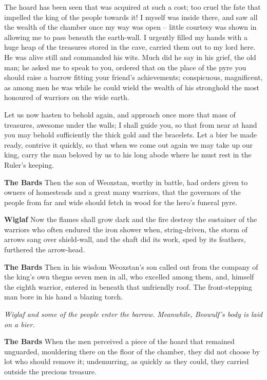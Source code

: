 \documentclass[a4paper]{article}
\begin{document}
{The hoard has been seen
that was acquired at such a cost; too cruel the fate
that impelled the king of the people towards it!
I myself was inside there, and saw all
the wealth of the chamber once my way was open
– little courtesy was shown in allowing me to pass
beneath the earth-wall. I urgently filled
my hands with a huge heap of the treasures
stored in the cave, carried them out
to my lord here. He was alive still
and commanded his wits. Much did he say
in his grief, the old man; he asked me to speak to you,
ordered that on the place of the pyre you should raise
a barrow fitting your friend’s achievements;
conspicuous, magnificent, as among men he was
while he could wield the wealth of his stronghold
the most honoured of warriors on the wide earth.

Let us now hasten to behold again,
and approach once more that mass of treasures,
awesome under the walls; I shall guide you,
so that from near at hand you may behold sufficiently
the thick gold and the bracelets. Let a bier be
made ready,
contrive it quickly, so that when we come out again
we may take up our king, carry the man
beloved by us to his long abode
where he must rest in the Ruler’s keeping.

\textbf{The Bards} Then the son of Weoxstan, worthy in battle,
had orders given to owners of homesteads
and a great many warriors, that the governors of the people
from far and wide should fetch in wood
for the hero’s funeral pyre.

\textbf{Wiglaf} Now the flames shall grow dark
and the fire destroy the sustainer of the warriors
who often endured the iron shower
when, string-driven, the storm of arrows
sang over shield-wall, and the shaft did its work,
sped by its feathers, furthered the arrow-head.

\textbf{The Bards} Then in his wisdom Weoxstan’s son
called out from the company of the king’s own thegns
seven men in all, who excelled among them,
and, himself the eighth warrior, entered in beneath
that unfriendly roof. The front-stepping man
bore in his hand a blazing torch.

\centerline{\textit{Wiglaf and some of the people enter the barrow. Meanwhile, Beowulf's body is laid on a bier.}}

\textbf{The Bards} When the men perceived a piece of the hoard
that remained unguarded, mouldering there
on the floor of the chamber, they did not choose by lot
who should remove it; undemurring,
as quickly as they could, they carried outside
the precious treasure.

}
\end{document}
